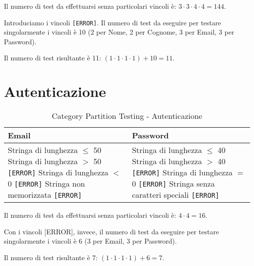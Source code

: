 Il numero di test da effettuarsi senza particolari vincoli è: $3 \cdot 3 \cdot 4 \cdot 4 = 144$.

Introduciamo i vincoli \texttt{[ERROR]}. Il numero di test da eseguire per testare singolarmente i vincoli è 10 (2 per Nome, 2 per Cognome, 3 per Email, 3 per Password).

Il numero di test risultante è 11: $(1 \cdot 1 \cdot 1 \cdot 1) + 10 = 11$.

\section{Autenticazione}
\begin{table}[H]
    \centering
    \footnotesize
    \renewcommand{\arraystretch}{1.5}
    \begin{tabular}{|p{6cm}|p{6cm}|}
       \hline
       \textbf{Email} & \textbf{Password} \\
       \hline
       Stringa di lunghezza $\leq$ 50 \newline
       Stringa di lunghezza $>$ 50 \texttt{[ERROR]} \newline
       Stringa di lunghezza $<$ 0 \texttt{[ERROR]} \newline
       Stringa non memorizzata \texttt{[ERROR]} &

       Stringa di lunghezza $\leq$ 40 \newline
       Stringa di lunghezza $>$ 40 \texttt{[ERROR]} \newline
       Stringa di lunghezza $=$ 0 \texttt{[ERROR]} \newline
       Stringa senza caratteri speciali \texttt{[ERROR]} \\
       \hline
    \end{tabular}
    \caption{Category Partition Testing - Autenticazione}
\end{table}

\noindent Il numero di test da effettuarsi senza particolari vincoli è: $4 \cdot 4 = 16$.

\noindent Con i vincoli [ERROR], invece, il numero di test da eseguire per testare singolarmente i vincoli è 6 (3 per Email, 3 per Password).

\noindent Il numero di test risultante è 7: $(1 \cdot 1 \cdot 1 \cdot 1) + 6 = 7$.

